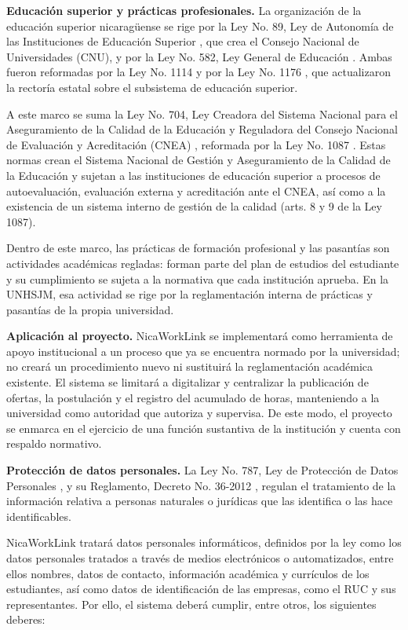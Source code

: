 \textbf{Educación superior y prácticas profesionales.} La organización de la educación superior nicaragüense se rige por la Ley No. 89, Ley de Autonomía de las Instituciones de Educación Superior \parencite{ley89_1990}, que crea el Consejo Nacional de Universidades (CNU), y por la Ley No. 582, Ley General de Educación \parencite{ley582}. Ambas fueron reformadas por la Ley No. 1114 \parencite{ley1114_2022} y por la Ley No. 1176 \parencite{ley1176_2023}, que actualizaron la rectoría estatal sobre el subsistema de educación superior.

A este marco se suma la Ley No. 704, Ley Creadora del Sistema Nacional para el Aseguramiento de la Calidad de la Educación y Reguladora del Consejo Nacional de Evaluación y Acreditación (CNEA) \parencite{ley704_2011}, reformada por la Ley No. 1087 \parencite{ley1087_2021}. Estas normas crean el Sistema Nacional de Gestión y Aseguramiento de la Calidad de la Educación y sujetan a las instituciones de educación superior a procesos de autoevaluación, evaluación externa y acreditación ante el CNEA, así como a la existencia de un sistema interno de gestión de la calidad (arts. 8 y 9 de la Ley 1087).

Dentro de este marco, las prácticas de formación profesional y las pasantías son actividades académicas regladas: forman parte del plan de estudios del estudiante y su cumplimiento se sujeta a la normativa que cada institución aprueba. En la UNHSJM, esa actividad se rige por la reglamentación interna de prácticas y pasantías de la propia universidad.

\textbf{Aplicación al proyecto.} NicaWorkLink se implementará como herramienta de apoyo institucional a un proceso que ya se encuentra normado por la universidad; no creará un procedimiento nuevo ni sustituirá la reglamentación académica existente. El sistema se limitará a digitalizar y centralizar la publicación de ofertas, la postulación y el registro del acumulado de horas, manteniendo a la universidad como autoridad que autoriza y supervisa. De este modo, el proyecto se enmarca en el ejercicio de una función sustantiva de la institución y cuenta con respaldo normativo.

\textbf{Protección de datos personales.} La Ley No. 787, Ley de Protección de Datos Personales \parencite{ley787_2012}, y su Reglamento, Decreto No. 36-2012 \parencite{decreto36_2012}, regulan el tratamiento de la información relativa a personas naturales o jurídicas que las identifica o las hace identificables.

NicaWorkLink tratará datos personales informáticos, definidos por la ley como los datos personales tratados a través de medios electrónicos o automatizados, entre ellos nombres, datos de contacto, información académica y currículos de los estudiantes, así como datos de identificación de las empresas, como el RUC y sus representantes. Por ello, el sistema deberá cumplir, entre otros, los siguientes deberes:

